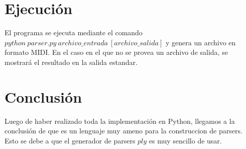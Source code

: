 \documentclass[a4paper, 10pt, twoside]{article}
\begin{document}

\section{Ejecución}
El programa se ejecuta mediante el comando $python\ parser.py\ archivo\_entrada\ [archivo\_salida]$ y genera un archivo en formato MIDI. En el caso en el que no se provea un archivo de salida, se mostrará el resultado en la salida estandar. 



\section{Conclusión}

Luego de haber realizado toda la implementación en Python, llegamos a la conclusión de que es un lenguaje muy ameno para la construccion de parsers. Esto se debe a que el generador de parsers $ply$ es muy sencillo de usar.
\end{document}
